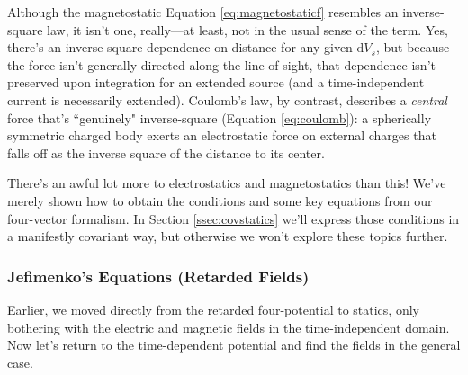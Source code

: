 \documentclass[12pt]{article}
\newcommand{\dd}[1]{\mathrm{d}#1}
\begin{document}
Although the magnetostatic Equation \ref{eq:magnetostaticf} resembles an inverse-square law, it isn't one, really---at least, not in the usual sense of the term. Yes, there's an inverse-square dependence on distance for any given $\dd V_{s}$, but because the force isn't generally directed along the line of sight, that dependence isn't preserved upon integration for an extended source (and a time-independent current is necessarily extended). Coulomb's law, by contrast, describes a \emph{central} force that's ``genuinely" inverse-square (Equation \ref{eq:coulomb}): a spherically symmetric charged body exerts an electrostatic force on external charges that falls off as the inverse square of the distance to its center.

There's an awful lot more to electrostatics and magnetostatics than this! We've merely shown how to obtain the conditions and some key equations from our four-vector formalism. In Section \ref{ssec:covstatics} we'll express those conditions in a manifestly covariant way, but otherwise we won't explore these topics further.


\subsubsection[Jefimenko’s Equations (Retarded Fields)]{Jefimenko's Equations (Retarded Fields)}

Earlier, we moved directly from the retarded four-potential to statics, only bothering with the electric and magnetic fields in the time-independent domain. Now let's return to the time-dependent potential and find the fields in the general case.
\end{document}
